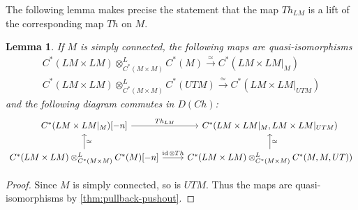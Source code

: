\documentclass{scrartcl}
\theoremstyle{plain}
\newtheorem{lemma}[theorem]{Lemma}
\theoremstyle{definition}
\newcommand{\cupp}{\mathbin{\smile}}
\DeclareMathOperator{\cone}{cone}
\DeclareMathOperator{\cofib}{cofib}
\newcommand{\iso}{\cong}
\newcommand{\quiso}{\simeq}
\newcommand{\from}{\leftarrow}
\let\xto\xrightarrow
\DeclareMathOperator{\id}{id}
\begin{document}
\begin{enumerate}[(1)]
The following lemma makes precise the statement that the map $Th_{LM}$ is a lift of the corresponding map $Th$ on $M$.
\begin{lemma}\label{lem:thom-map-LM-equal}
    If $M$ is simply connected, the following maps are quasi-isomorphisms
    \begin{align*}
        C^*(LM\times LM)\otimes^L_{C^*(M\times M)} C^*(M) \xto{\quiso} C^*(LM\times LM|_M) \\
        C^*(LM\times LM)\otimes^L_{C^*(M\times M)} C^*(UTM) \xto{\quiso} C^*(LM\times LM|_{UTM}) 
    \end{align*} 
    and the following diagram commutes in $D(Ch)$:
    \begin{equation}\label{diag:lem-thom-map-LM-equal}
    \begin{tikzcd}
        C^*(LM\times LM|_M)[-n] \rar["Th_{LM}"] &  C^{*}(LM\times LM|_{M}, LM\times LM|_{UTM}) \\
        \uar[swap, "\quiso"] C^*(LM\times LM)\otimes^L_{C^*(M\times M)} C^*(M)[-n] \rar["\id\otimes Th"] &  C^*(LM\times LM)\otimes^L_{C^*(M\times M)} C^*(M, M, UT)) \uar[swap, "\quiso"]
    \end{tikzcd}
    \end{equation}
\end{lemma}
\begin{proof}
    Since $M$ is simply connected, so is $UTM$. Thus the maps are quasi-isomorphisms by \cref{thm:pullback-pushout}. 



\end{proof}
\end{enumerate}
\end{document}
